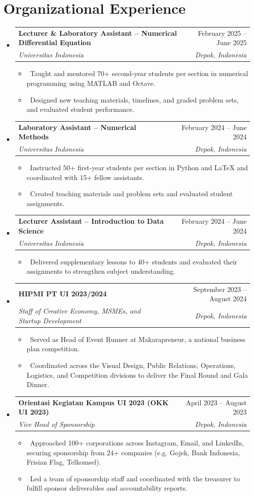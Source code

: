 \documentclass[letterpaper,10pt]{article}
\makeatletter
\newcommand{\resumeItem}[1]{\item\small{#1}}
\newcommand{\resumeSubheading}[4]{
\vspace{-1pt}\item
  \begin{tabular*}{0.97\textwidth}[t]{l@{\extracolsep{\fill}}r}
    \textbf{#1} & #2 \\
    \textit{#3} & \textit{#4} \\
  \end{tabular*}\vspace{-7pt}
}
\newcommand{\resumeSubHeadingList}{\begin{itemize}[leftmargin=0.15in, label={}]}
\newcommand{\resumeSubHeadingListEnd}{\end{itemize}}
\makeatother
\begin{document}
\section{Organizational Experience}
\resumeSubHeadingList
  \resumeSubheading
      {Lecturer \& Laboratory Assistant -- Numerical Differential Equation}{February 2025 -- June 2025}
      {Universitas Indonesia}{Depok, Indonesia}
      \resumeSubHeadingList
          \resumeItem{\textbullet\ Taught and mentored 70+ second-year students per section in numerical programming using MATLAB and Octave.}
          \resumeItem{\textbullet\ Designed new teaching materials, timelines, and graded problem sets, and evaluated student performance.}
      \resumeSubHeadingListEnd
  \resumeSubheading
      {Laboratory Assistant -- Numerical Methods}{February 2024 -- June 2024}
      {Universitas Indonesia}{Depok, Indonesia}
      \resumeSubHeadingList
          \resumeItem{\textbullet\ Instructed 50+ first-year students per section in Python and LaTeX and coordinated with 15+ fellow assistants.}
          \resumeItem{\textbullet\ Created teaching materials and problem sets and evaluated student assignments.}
      \resumeSubHeadingListEnd
  \resumeSubheading
      {Lecturer Assistant -- Introduction to Data Science}{February 2024 -- June 2024}
      {Universitas Indonesia}{Depok, Indonesia}
      \resumeSubHeadingList
          \resumeItem{\textbullet\ Delivered supplementary lessons to 40+ students and evaluated their assignments to strengthen subject understanding.}
      \resumeSubHeadingListEnd
  \resumeSubheading
      {HIPMI PT UI 2023/2024}{September 2023 -- August 2024}
      {Staff of Creative Economy, MSMEs, and Startup Development}{Depok, Indonesia}
      \resumeSubHeadingList
          \resumeItem{\textbullet\ Served as Head of Event Runner at Makarapreneur, a national business plan competition.}
          \resumeItem{\textbullet\ Coordinated across the Visual Design, Public Relations, Operations, Logistics, and Competition divisions to deliver the Final Round and Gala Dinner.}
      \resumeSubHeadingListEnd
  \resumeSubheading
      {Orientasi Kegiatan Kampus UI 2023 (OKK UI 2023)}{April 2023 -- August 2023}
      {Vice Head of Sponsorship}{Depok, Indonesia}
      \resumeSubHeadingList
          \resumeItem{\textbullet\ Approached 100+ corporations across Instagram, Email, and LinkedIn, securing sponsorship from 24+ companies (e.g. Gojek, Bank Indonesia, Frisian Flag, Telkomsel).}
          \resumeItem{\textbullet\ Led a team of sponsorship staff and coordinated with the treasurer to fulfill sponsor deliverables and accountability reports.}
      \resumeSubHeadingListEnd
\resumeSubHeadingListEnd
\end{document}
